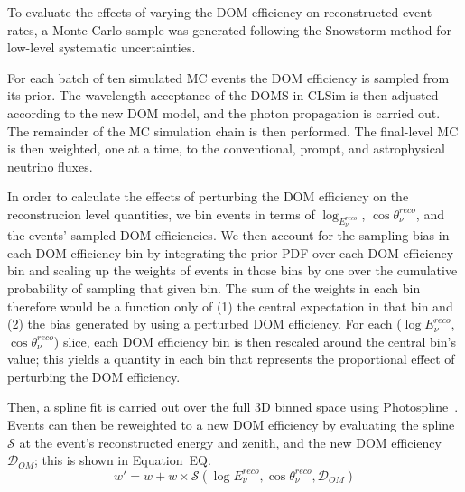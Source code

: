 \documentclass[main.tex]{subfiles}
\begin{document}
To evaluate the effects of varying the DOM efficiency on reconstructed event rates, a Monte Carlo sample was generated following the Snowstorm method for low-level systematic uncertainties.

For each batch of ten simulated MC events the DOM efficiency is sampled from its prior. 
The wavelength acceptance of the DOMS in CLSim is then adjusted according to the new DOM model, and the photon propagation is carried out. 
The remainder of the MC simulation chain is then performed.
The final-level MC is then weighted, one at a time, to the conventional, prompt, and astrophysical neutrino fluxes. 

In order to calculate the effects of perturbing the DOM efficiency on the reconstrucion level quantities, we bin events in terms of $\log_{E_{\nu}^{reco}}$, $\cos\theta_{\nu}^{reco}$, and the events' sampled DOM efficiencies. 
We then account for the sampling bias in each DOM efficiency bin by integrating the prior PDF over each DOM efficiency bin and scaling up the weights of events in those bins by one over the cumulative probability of sampling that given bin. 
The sum of the weights in each bin therefore would be a function only of (1) the central expectation in that bin and (2) the bias generated by using a perturbed DOM efficiency. 
For each ($\log E_{\nu}^{reco}$, $\cos\theta_{\nu}^{reco}$) slice, each DOM efficiency bin is then rescaled around the central bin's value; this yields a quantity in each bin that represents the proportional effect of perturbing the DOM efficiency. 

Then, a spline fit is carried out over the full 3D binned space using Photospline~\cite{WHITEHORN20132214}. 
Events can then be reweighted to a new DOM efficiency by evaluating the spline $\mathcal{S}$ at the event's reconstructed energy and zenith, and the new DOM efficiency $\mathcal{D}_{OM}$; this is shown in Equation~EQ.
\begin{equation}\label{eq:domeff}
    w' = w + w\times \mathcal{S}(\log E_{\nu}^{reco}, \cos\theta_{\nu}^{reco}, \mathcal{D}_{OM})
\end{equation}
\end{document}
